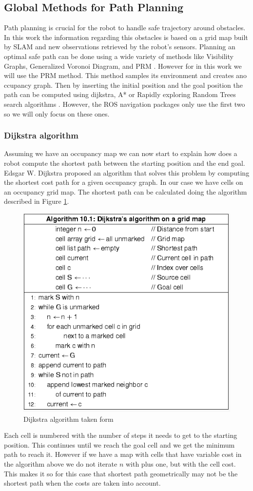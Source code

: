 \subsection{Global Methods for Path Planning}
Path planning is crucial for the robot to handle safe trajectory around obstacles. In this work the information regarding this obstacles is based on a grid map built by \ac{SLAM} and new observations retrieved by the robot's sensors.  Planning an optimal safe path can be done using a wide variety of methods like Visibility Graphs, Generalized Voronoi Diagram, and \ac{PRM} \cite{globalmethods}. However for in this work we will use the \ac{PRM} method. This method samples its environment and creates ano ccupancy graph. Then by inserting the initial position and the goal position the path can be computed using dijkstra, A* or Rapidly exploring Random Trees search algorithms . However, the \ac{ROS} navigation packages only use the first two so  we will only focus on these ones.


\subsubsection{Dijkstra algorithm}\label{djk}
Assuming we have an occupancy map we can now start to explain how does a robot compute the shortest path between the starting position and the end goal. Edsgar W. Dijkstra proposed an algorithm that solves this problem by computing the shortest cost path for a given occupancy graph. In our case we have cells on an occupancy grid map. The shortest path can be calculated doing the algorithm described in Figure \ref{fig:dalg}. 
\begin{figure}[ht!] 
\centerline{\includegraphics [width=0.7 \textwidth]{imgs/chapter5/Dalg.png}}
\caption[Dijkstra algorithm]{Dijkstra algorithm taken form \cite{Ben-Ari2018}}
\label{fig:dalg}
\end{figure}
Each cell is numbered with the number of steps it needs to get to the starting position. This continues until we reach the goal cell and we get the minimum path to reach it. However if we have a map with cells that have variable cost in the algorithm above we do not iterate $n$ with plus one, but with the cell cost. This makes it so for this case that  shortest path geometrically may not be the shortest path when the costs are taken into account.

